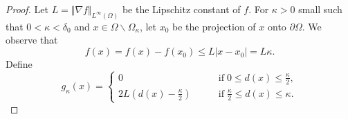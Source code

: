 \documentclass[11pt,reqno]{amsart}
\numberwithin{figure}{section}
\theoremstyle{plain}
\theoremstyle{remark}
\numberwithin{equation}{section}
\begin{document}
\begin{proof} Let $L = \Vert \nabla f\Vert_{L^\infty(\Omega)}$ be the Lipschitz constant of $f$. For $\kappa>0$ small such that $0<\kappa<\delta_0$ and $x\in \Omega\backslash \Omega_\kappa$, let $x_0$ be the projection of $x$ onto $\partial\Omega$. We observe that
\begin{equation}\label{e:bound_aa}
    f(x) = f(x) - f(x_0) \leq L|x-x_0| = L\kappa.
\end{equation}
Define
\begin{equation*}
    g_\kappa(x) = 
    \begin{cases}
        0           &\qquad\text{if}\;0\leq d(x) \leq \frac{\kappa}{2},\\
        2L\left(d(x)-\frac{\kappa}{2}\right)       &\qquad\text{if}\;\frac{\kappa}{2}\leq d(x) \leq \kappa.
    \end{cases}
\end{equation*}


\end{proof}
\end{document}
